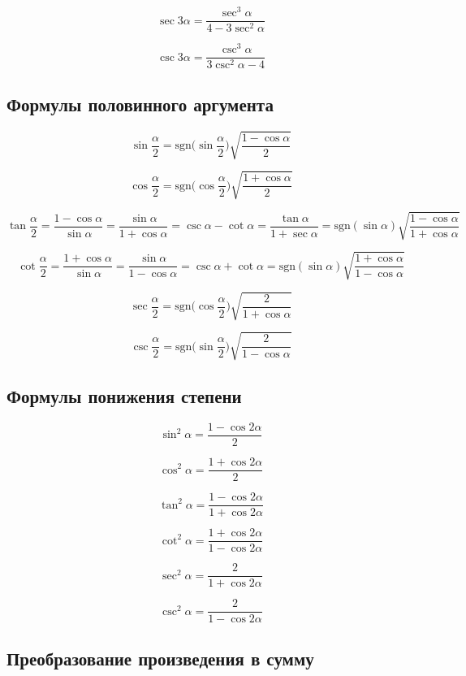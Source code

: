 \documentclass[
  letterpaper,
  DIV=11,
  numbers=noendperiod]{scrreprt}
\newcommand{\sgn}{\mathrm{sgn}}
\theoremstyle{definition}
\theoremstyle{remark}
\begin{document}
\[
\sec 3\alpha = \frac{\sec^3 \alpha}{4 - 3\sec^2 \alpha}
\]

\[
\csc 3\alpha = \frac{\csc^3 \alpha}{3\csc^2 \alpha -4}
\]

\subsection{Формулы половинного аргумента}\label{trig_half_arg}

\[
\sin \frac{\alpha}{2} = \sgn \Big(\sin \frac{\alpha}{2} \Big) \sqrt{\frac{1 - \cos \alpha}{2}}
\]

\[
\cos \frac{\alpha}{2} = \sgn \Big( \cos \frac{\alpha}{2} \Big) \sqrt{\frac{1 + \cos \alpha}{2}}
\]

\[
\tan \frac{\alpha}{2} = \frac{1 - \cos\alpha}{\sin \alpha} = \frac{\sin \alpha}{1 + \cos \alpha} = \csc \alpha - \cot \alpha = \frac{\tan \alpha}{1 + \sec \alpha} = \sgn (\sin \alpha) \sqrt{\frac{1 - \cos \alpha}{1 + \cos \alpha}}
\]

\[
\cot \frac{\alpha}{2} = \frac{1 + \cos \alpha}{\sin \alpha} = \frac{\sin \alpha}{1 - \cos \alpha} = \csc \alpha + \cot \alpha = \sgn(\sin \alpha) \sqrt{\frac{1 + \cos \alpha}{1 - \cos{\alpha}}}
\]

\[
\sec \frac{\alpha}{2} = \sgn \Big( \cos \frac{\alpha}{2} \Big) \sqrt{\frac{2}{1 + \cos \alpha}}
\]

\[
\csc \frac{\alpha}{2} = \sgn \Big( \sin \frac{\alpha}{2}  \Big) \sqrt{\frac{2}{1 - \cos \alpha}}
\]

\subsection{Формулы понижения степени}\label{trig_power_reduction}

\[
\sin^2 \alpha = \frac{1 - \cos 2\alpha}{2}
\]

\[
\cos^2 \alpha = \frac{1 + \cos 2\alpha}{2}
\]

\[
\tan^2 \alpha = \frac{1 - \cos 2\alpha}{1 + \cos 2\alpha}
\]

\[
\cot^2 \alpha = \frac{1 + \cos 2\alpha}{1 - \cos 2\alpha}
\]

\[
\sec^2 \alpha = \frac{2}{1 + \cos 2\alpha}
\]

\[
\csc^2 \alpha = \frac{2}{1 - \cos 2\alpha}
\]

\subsection{Преобразование произведения в сумму}\label{trig_prod_to_sum}
\end{document}
